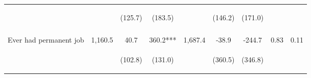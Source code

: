 \begin{tabular}{lcccccccc}
 & \begin{footnotesize}\end{footnotesize} & \begin{footnotesize}(125.7)\end{footnotesize} & \begin{footnotesize}(183.5)\end{footnotesize} & \begin{footnotesize}\end{footnotesize} & \begin{footnotesize}(146.2)\end{footnotesize} & \begin{footnotesize}(171.0)\end{footnotesize} & \begin{footnotesize}\end{footnotesize} & \begin{footnotesize}\end{footnotesize}\\
 & \begin{footnotesize}\end{footnotesize} & \begin{footnotesize}[1.000]\end{footnotesize} & \begin{footnotesize}[0.049]\end{footnotesize} & \begin{footnotesize}\end{footnotesize} & \begin{footnotesize}[1.000]\end{footnotesize} & \begin{footnotesize}[0.367]\end{footnotesize} & \begin{footnotesize}\end{footnotesize} & \begin{footnotesize}\end{footnotesize}\\
\noalign{\smallskip}Ever had permanent job & 1,160.5 & 40.7 & 360.2*** & 1,687.4 & -38.9 & -244.7 & 0.83 & 0.11\\
 & \begin{footnotesize}\end{footnotesize} & \begin{footnotesize}(102.8)\end{footnotesize} & \begin{footnotesize}(131.0)\end{footnotesize} & \begin{footnotesize}\end{footnotesize} & \begin{footnotesize}(360.5)\end{footnotesize} & \begin{footnotesize}(346.8)\end{footnotesize} & \begin{footnotesize}\end{footnotesize} & \begin{footnotesize}\end{footnotesize}\\

\end{tabular}
